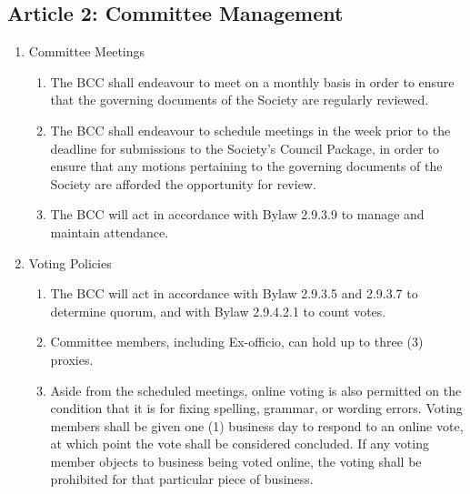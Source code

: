 \subsection{Article 2: Committee Management}
\begin{enumerate}[label*=\arabic*., align=left]	
\item Committee Meetings
\begin{enumerate}[label*=\arabic*., align=left]	
\item The BCC shall endeavour to meet on a monthly basis in order to ensure that the governing documents of the Society are regularly reviewed.
\item The BCC shall endeavour to schedule meetings in the week prior to the deadline for submissions to the Society's Council Package, in order to ensure that any motions pertaining to the governing documents of the Society are afforded the opportunity for review.
\item The BCC will act in accordance with Bylaw 2.9.3.9 to manage and maintain attendance.
\end{enumerate}

\item Voting Policies
\begin{enumerate}[label*=\arabic*., align=left]	
\item The BCC  will act in accordance with Bylaw 2.9.3.5 and 2.9.3.7 to determine quorum, and with Bylaw 2.9.4.2.1 to count votes.
\item Committee members, including Ex-officio, can hold up to three (3) proxies.
\item Aside from the scheduled meetings, online voting is also permitted on the condition that it is for fixing spelling, grammar, or wording errors. Voting members shall be given one (1) business day to respond to an online vote, at which point the vote shall be considered concluded. If any voting member objects to business being voted online, the voting shall be prohibited for that particular piece of business.
\end{enumerate}

\end{enumerate}

